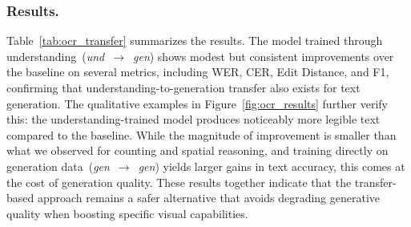 \subsubsection{Results.} Table~\ref{tab:ocr_transfer} summarizes the results. The model trained through understanding~(\textit{und}~$\rightarrow$~\textit{gen}) shows modest but consistent improvements over the baseline on several metrics, including WER, CER, Edit Distance, and F1, confirming that understanding-to-generation transfer also exists for text generation. The qualitative examples in Figure~\ref{fig:ocr_results} further verify this: the understanding-trained model produces noticeably more legible text compared to the baseline. While the magnitude of improvement is smaller than what we observed for counting and spatial reasoning, and training directly on generation data~(\textit{gen}~$\rightarrow$~\textit{gen}) yields larger gains in text accuracy, this comes at the cost of generation quality. These results together indicate that the transfer-based approach remains a safer alternative that avoids degrading generative quality when boosting specific visual capabilities. 
